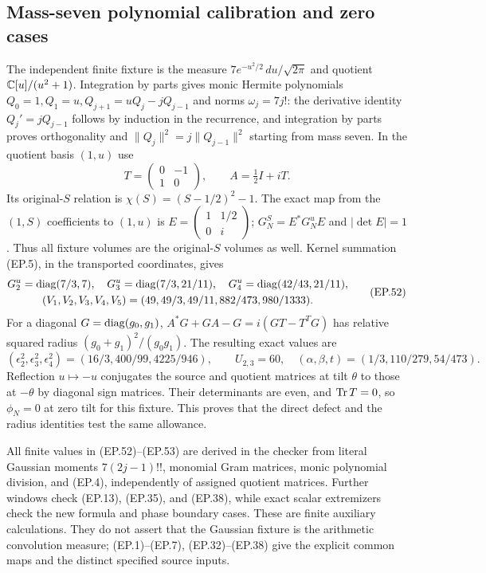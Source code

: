 \subsection{Mass-seven polynomial calibration and zero cases}
The independent finite fixture is the measure
$7e^{-u^2/2}\,du/\sqrt{2\pi}$ and quotient $\mathbb C[u]/(u^2+1)$.
Integration by parts gives monic Hermite polynomials
$Q_0=1,Q_1=u,Q_{j+1}=uQ_j-jQ_{j-1}$ and norms $\omega_j=7j!$:
the derivative identity $Q_j'=jQ_{j-1}$ follows by induction in
the recurrence, and integration by parts proves orthogonality and
$\|Q_j\|^2=j\|Q_{j-1}\|^2$ starting from mass seven.
In the quotient basis $(1,u)$ use
\[
 T=\begin{pmatrix}0&-1\\1&0\end{pmatrix},\qquad A=\tfrac12I+iT.
 \tag{EP.51}
\]
Its original-$S$ relation is $\chi(S)=(S-1/2)^2-1$.
The exact map from the $(1,S)$ coefficients to $(1,u)$ is
$E=\left(\begin{smallmatrix}1&1/2\\0&i\end{smallmatrix}\right)$;
$G_N^S=E^*G_N^uE$ and $|\det E|=1$.
Thus all fixture volumes are the original-$S$ volumes as well.
Kernel summation (EP.5), in the transported coordinates, gives
\[
 \begin{gathered}
 G_2^u=\operatorname{diag}(7/3,7),\quad
 G_3^u=\operatorname{diag}(7/3,21/11),\quad
 G_4^u=\operatorname{diag}(42/43,21/11),\\
 (V_1,V_2,V_3,V_4,V_5)
 =(49,49/3,49/11,882/473,980/1333).
 \end{gathered}\tag{EP.52}
\]
For a diagonal $G=\operatorname{diag}(g_0,g_1)$,
$A^*G+GA-G=i(GT-T^TG)$ has relative squared radius
$(g_0+g_1)^2/(g_0g_1)$. The resulting exact values are
\[
 (\epsilon_2^2,\epsilon_3^2,\epsilon_4^2)
 =(16/3,400/99,4225/946),\qquad
 U_{2,3}=60,\quad(\alpha,\beta,t)=(1/3,110/279,54/473).
 \tag{EP.53}
\]
Reflection $u\mapsto-u$ conjugates the source and quotient matrices
at tilt $\theta$ to those at $-\theta$ by diagonal sign matrices.
Their determinants are even, and $\operatorname{Tr} T=0$, so $\phi_N=0$ at
zero tilt for this fixture. This proves that the direct defect and
the radius identities test the same allowance.

All finite values in (EP.52)--(EP.53) are derived in the checker
from literal Gaussian moments $7(2j-1)!!$, monomial Gram matrices,
monic polynomial division, and (EP.4), independently of assigned
quotient matrices. Further windows check (EP.13), (EP.35), and
(EP.38), while exact scalar extremizers check the new formula and
phase boundary cases. These are finite auxiliary calculations.
They do not assert that the Gaussian fixture is the arithmetic
convolution measure; (EP.1)--(EP.7), (EP.32)--(EP.38) give the
explicit common maps and the distinct specified source inputs.

